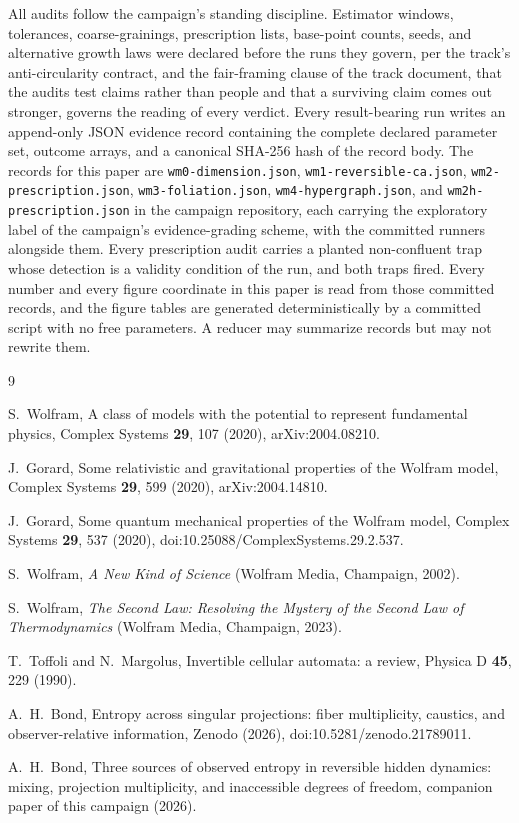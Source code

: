 \documentclass[aps,pre,reprint,nofootinbib]{revtex4-2}
\begin{document}
All audits follow the campaign's standing discipline.  Estimator
windows, tolerances, coarse-grainings, prescription lists, base-point
counts, seeds, and alternative growth laws were declared before the
runs they govern, per the track's anti-circularity contract, and the
fair-framing clause of the track document, that the audits test
claims rather than people and that a surviving claim comes out
stronger, governs the reading of every verdict.  Every result-bearing
run writes an append-only JSON evidence record containing the
complete declared parameter set, outcome arrays, and a canonical
SHA-256 hash of the record body.  The records for this paper are
\texttt{wm0-dimension.json}, \texttt{wm1-reversible-ca.json},
\texttt{wm2-prescription.json}, \texttt{wm3-foliation.json},
\texttt{wm4-hypergraph.json}, and \texttt{wm2h-prescription.json} in
the campaign repository, each carrying the exploratory label of the
campaign's evidence-grading scheme, with the committed runners
alongside them.  Every prescription audit carries a planted
non-confluent trap whose detection is a validity condition of the
run, and both traps fired.  Every number and every figure coordinate
in this paper is read from those committed records, and the figure
tables are generated deterministically by a committed script with no
free parameters.  A reducer may summarize records but may not rewrite
them.

\begin{thebibliography}{9}

S.~Wolfram,
A class of models with the potential to represent fundamental physics,
Complex Systems \textbf{29}, 107 (2020),
arXiv:2004.08210.

J.~Gorard,
Some relativistic and gravitational properties of the Wolfram model,
Complex Systems \textbf{29}, 599 (2020),
arXiv:2004.14810.

J.~Gorard,
Some quantum mechanical properties of the Wolfram model,
Complex Systems \textbf{29}, 537 (2020),
doi:10.25088/ComplexSystems.29.2.537.

S.~Wolfram,
\emph{A New Kind of Science}
(Wolfram Media, Champaign, 2002).

S.~Wolfram,
\emph{The Second Law: Resolving the Mystery of the Second Law of
Thermodynamics}
(Wolfram Media, Champaign, 2023).

T.~Toffoli and N.~Margolus,
Invertible cellular automata: a review,
Physica D \textbf{45}, 229 (1990).

A.~H.~Bond,
Entropy across singular projections: fiber multiplicity, caustics, and
observer-relative information,
Zenodo (2026), doi:10.5281/zenodo.21789011.

A.~H.~Bond,
Three sources of observed entropy in reversible hidden dynamics:
mixing, projection multiplicity, and inaccessible degrees of freedom,
companion paper of this campaign (2026).

\end{thebibliography}
\end{document}
